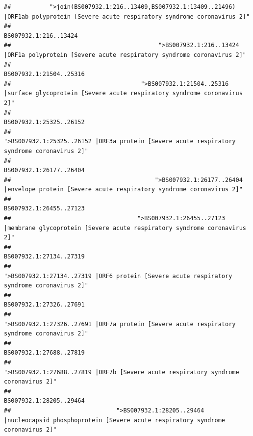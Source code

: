 \documentclass[
]{article}
\begin{document}
\begin{verbatim}
##           ">join(BS007932.1:216..13409,BS007932.1:13409..21496) |ORF1ab polyprotein [Severe acute respiratory syndrome coronavirus 2]" 
##                                                                                                                  BS007932.1:216..13424 
##                                          ">BS007932.1:216..13424 |ORF1a polyprotein [Severe acute respiratory syndrome coronavirus 2]" 
##                                                                                                                BS007932.1:21504..25316 
##                                     ">BS007932.1:21504..25316 |surface glycoprotein [Severe acute respiratory syndrome coronavirus 2]" 
##                                                                                                                BS007932.1:25325..26152 
##                                            ">BS007932.1:25325..26152 |ORF3a protein [Severe acute respiratory syndrome coronavirus 2]" 
##                                                                                                                BS007932.1:26177..26404 
##                                         ">BS007932.1:26177..26404 |envelope protein [Severe acute respiratory syndrome coronavirus 2]" 
##                                                                                                                BS007932.1:26455..27123 
##                                    ">BS007932.1:26455..27123 |membrane glycoprotein [Severe acute respiratory syndrome coronavirus 2]" 
##                                                                                                                BS007932.1:27134..27319 
##                                             ">BS007932.1:27134..27319 |ORF6 protein [Severe acute respiratory syndrome coronavirus 2]" 
##                                                                                                                BS007932.1:27326..27691 
##                                            ">BS007932.1:27326..27691 |ORF7a protein [Severe acute respiratory syndrome coronavirus 2]" 
##                                                                                                                BS007932.1:27688..27819 
##                                                    ">BS007932.1:27688..27819 |ORF7b [Severe acute respiratory syndrome coronavirus 2]" 
##                                                                                                                BS007932.1:28205..29464 
##                              ">BS007932.1:28205..29464 |nucleocapsid phosphoprotein [Severe acute respiratory syndrome coronavirus 2]" 

\end{verbatim}
\end{document}
